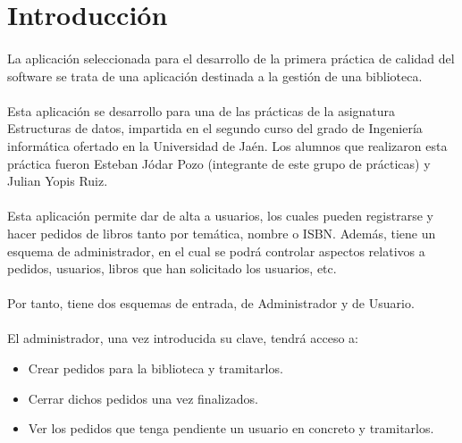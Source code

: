 \section{Introducción}

	\paragraph{}\textsf{La aplicación seleccionada para el desarrollo de la primera práctica de calidad del software se trata de una aplicación destinada a la gestión de una biblioteca.}
	
	\paragraph{}Esta aplicación se desarrollo para una de las prácticas de la asignatura Estructuras de datos, impartida en el segundo curso del grado de Ingeniería informática ofertado en la Universidad de Jaén. Los alumnos que realizaron esta práctica fueron Esteban Jódar Pozo (integrante de este grupo de prácticas) y Julian Yopis Ruiz.
	
	\paragraph{}Esta aplicación permite dar de alta a usuarios, los cuales pueden registrarse y hacer pedidos de libros tanto por temática, nombre o ISBN. Además, tiene un esquema de administrador, en el cual se podrá controlar aspectos relativos a pedidos, usuarios, libros que han solicitado los usuarios, etc.
	
	\paragraph{}Por tanto, tiene dos esquemas de entrada, de Administrador y de Usuario.
	
	\paragraph{}El administrador, una vez introducida su clave, tendrá acceso a:
	
	\begin{itemize}
		\item Crear pedidos para la biblioteca y tramitarlos.
		\item Cerrar dichos pedidos una vez finalizados.
		\item Ver los pedidos que tenga pendiente un usuario en concreto y tramitarlos.
	\end{itemize}


